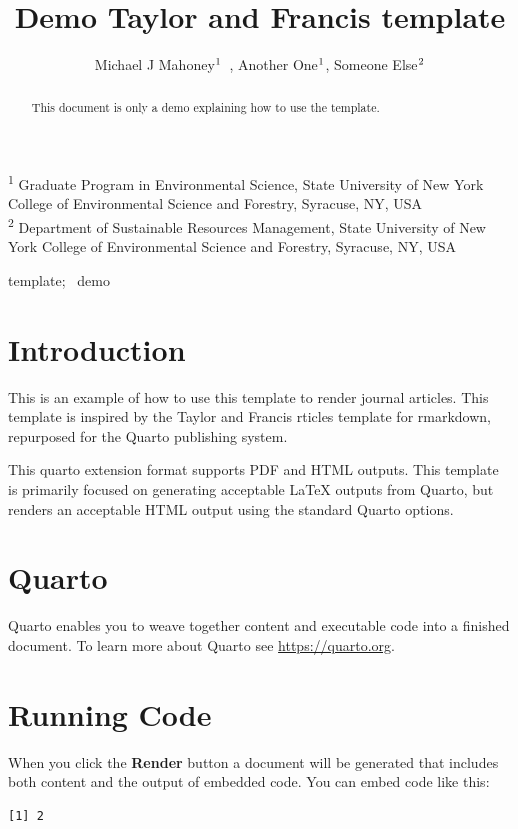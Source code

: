\documentclass[
]{interact}
\title{Demo Taylor and Francis template}
\author{Michael J
Mahoney$\textsuperscript{1}$~\orcidlink{0000-0003-2402-304X}, Another
One$\textsuperscript{1}$, Someone Else$\textsuperscript{2}$}
\begin{document}
\captionsetup{labelsep=space}
\maketitle
\textsuperscript{1} Graduate Program in Environmental Science, State
University of New York College of Environmental Science and
Forestry, Syracuse, NY, USA\\ \textsuperscript{2} Department of
Sustainable Resources Management, State University of New York College
of Environmental Science and Forestry, Syracuse, NY, USA
\begin{abstract}
This document is only a demo explaining how to use the template.
\end{abstract}
\begin{keywords}
\def\sep{;\ }
template\sep 
demo
\end{keywords}

\section{Introduction}\label{sec-intro}

This is an example of how to use this template to render journal
articles. This template is inspired by the Taylor and Francis rticles
template for rmarkdown, repurposed for the Quarto publishing system.

This quarto extension format supports PDF and HTML outputs. This
template is primarily focused on generating acceptable {\LaTeX} outputs
from Quarto, but renders an acceptable HTML output using the standard
Quarto options.

\section{Quarto}\label{quarto}

Quarto enables you to weave together content and executable code into a
finished document. To learn more about Quarto see
\url{https://quarto.org}.

\section{Running Code}\label{running-code}

When you click the \textbf{Render} button a document will be generated
that includes both content and the output of embedded code. You can
embed code like this:

\begin{verbatim}
[1] 2
\end{verbatim}
\end{document}
